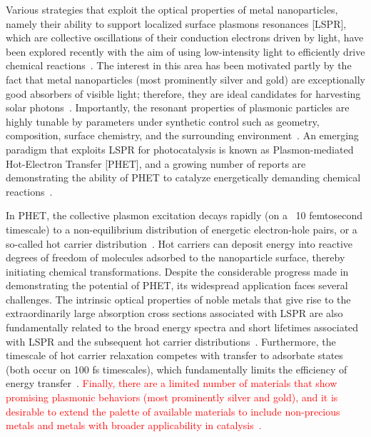 \documentclass[journal=jpclcd,manuscript=article]{achemso}
\begin{document}
Various strategies that exploit the optical properties of metal nanoparticles, namely their ability to support localized surface plasmons resonances [LSPR], 
which are collective oscillations of their 
conduction electrons driven by light, have been explored recently with the aim of using low-intensity light to efficiently drive chemical 
reactions~\cite{LCI_NatureMater_2011,KAC_ACSCatalysis_2013,ZLQ_RSCAdvances_2015,PKL_AccChemRes_2015}.  The interest in this area has 
been motivated partly by the fact that metal nanoparticles (most prominently silver and gold) are exceptionally good absorbers of visible light; therefore,
they are ideal candidates for harvesting solar photons~\cite{AP_NatMat_2010}.  
Importantly, the resonant properties of plasmonic particles are highly tunable by parameters under synthetic control such as geometry, composition, surface chemistry, and the surrounding 
environment~\cite{SX_Science_2002,BCN_ChemRev_2005,GB_NatPhoton_2010}.  An emerging paradigm that exploits LSPR for photocatalysis is known as Plasmon-mediated Hot-Electron Transfer [PHET],
and a growing number of reports are demonstrating the ability of PHET to catalyze energetically demanding chemical 
reactions~\cite{CXL_NatureChem_2011,MZL_Science_2013,MLL_NanoLett_2013,LFP_AC_2015,ZHX_NatPhoton_2016,ZJM_ACSNano_2016,SZZ_PNAS_2016,SCR_JPCC_2016}.

In PHET, the collective plasmon excitation decays rapidly (on a ~10 femtosecond timescale) to a non-equilibrium distribution of energetic electron-hole pairs, or a so-called hot carrier 
distribution~\cite{KAC_ACSCatalysis_2013,GZG_JPCC_2013,SNJ_NatComm_2014,WCM_Science_2015,MWW_NatComm_2015, BSN_ACSNano_2016}.  
Hot carriers can deposit energy into reactive degrees of freedom of molecules adsorbed 
to the nanoparticle surface, thereby initiating chemical transformations.  Despite 
the considerable progress made in 
demonstrating the potential of PHET, its widespread application 
faces several challenges. The intrinsic optical properties of noble metals that 
give rise to the extraordinarily 
large absorption cross sections associated with LSPR are also fundamentally 
related to the broad energy spectra and short lifetimes associated with LSPR 
and the subsequent hot carrier 
distributions~\cite{KS_JCP_1983}. 
Furthermore, the timescale of hot carrier relaxation competes 
with transfer to adsorbate states (both occur on 100 fs timescales), which fundamentally limits the efficiency of energy transfer~\cite{WCM_Science_2015}.  \textcolor{red}{Finally, there are a limited number of materials that show promising plasmonic
behaviors (most prominently silver and gold), and it is desirable to extend the palette of available materials to include
non-precious metals and metals with broader applicability in catalysis~\cite{SZZ_PNAS_2016}.}
\end{document}
